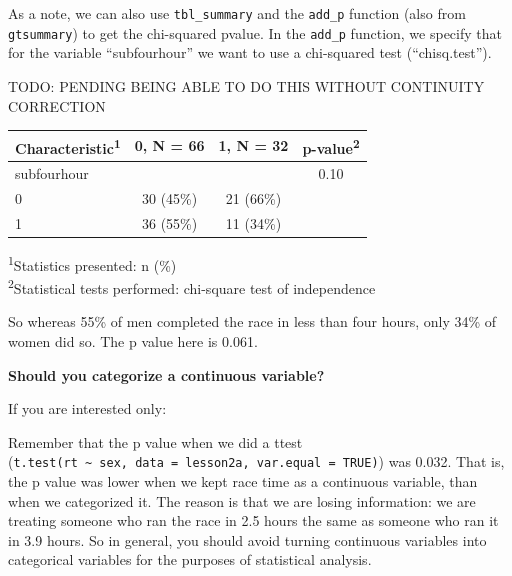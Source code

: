 \documentclass[]{book}
\newenvironment{Shaded}{\begin{snugshade}}{\end{snugshade}}
\newcommand{\DataTypeTok}[1]{\textcolor[rgb]{0.13,0.29,0.53}{#1}}
\newcommand{\KeywordTok}[1]{\textcolor[rgb]{0.13,0.29,0.53}{\textbf{#1}}}
\newcommand{\NormalTok}[1]{#1}
\newcommand{\OperatorTok}[1]{\textcolor[rgb]{0.81,0.36,0.00}{\textbf{#1}}}
\newcommand{\StringTok}[1]{\textcolor[rgb]{0.31,0.60,0.02}{#1}}
\begin{document}
As a note, we can also use \texttt{tbl\_summary} and the \texttt{add\_p} function (also from \texttt{gtsummary}) to get the chi-squared pvalue. In the \texttt{add\_p} function, we specify that for the variable ``subfourhour'' we want to use a chi-squared test (``chisq.test'').

TODO: PENDING BEING ABLE TO DO THIS WITHOUT CONTINUITY CORRECTION

\begin{Shaded}
\end{Shaded}

\captionsetup[table]{labelformat=empty,skip=1pt}
\begin{longtable}{lccc}
\toprule
\textbf{Characteristic}\textsuperscript{1} & \textbf{0}, N = 66 & \textbf{1}, N = 32 & \textbf{p-value}\textsuperscript{2} \\ 
\midrule
subfourhour &  &  & 0.10 \\ 
0 & 30 (45\%) & 21 (66\%) &  \\ 
1 & 36 (55\%) & 11 (34\%) &  \\ 
\bottomrule
\end{longtable}
\vspace{-5mm}
\begin{minipage}{\linewidth}
\textsuperscript{1}Statistics presented: n (\%) \\ 
\textsuperscript{2}Statistical tests performed: chi-square test of independence \\ 
\end{minipage}

So whereas 55\% of men completed the race in less than four hours, only 34\% of women did so. The p value here is 0.061.

\textbf{Should you categorize a continuous variable?}

If you are interested only:

Remember that the p value when we did a ttest (\texttt{t.test(rt\ \textasciitilde{}\ sex,\ data\ =\ lesson2a,\ var.equal\ =\ TRUE)}) was 0.032. That is, the p value was lower when we kept race time as a continuous variable, than when we categorized it. The reason is that we are losing information: we are treating someone who ran the race in 2.5 hours the same as someone who ran it in 3.9 hours. So in general, you should avoid turning continuous variables into categorical variables for the purposes of statistical analysis.
\end{document}
